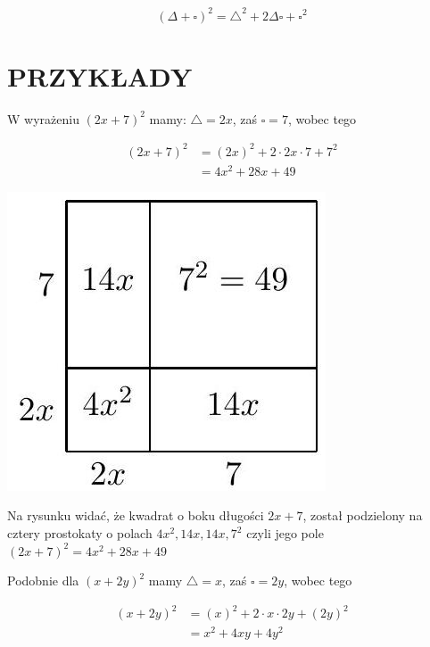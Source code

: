 \documentclass[10pt]{article}
\begin{document}
\[
(\Delta+\square)^{2}=\triangle^{2}+2 \Delta \square+\square^{2}
\]

\section*{PRZYKŁADY}
W wyrażeniu \((2 x+7)^{2}\) mamy: \(\triangle=2 x\), zaś \(\square=7\), wobec tego

\[
\begin{aligned}
(2 x+7)^{2} & =(2 x)^{2}+2 \cdot 2 x \cdot 7+7^{2} \\
& =4 x^{2}+28 x+49
\end{aligned}
\]

\begin{center}
\includegraphics[max width=\textwidth]{2024_11_21_8f01584889ff06348ae7g-103}
\end{center}

Na rysunku widać, że kwadrat o boku długości \(2 x+7\), został podzielony na cztery prostokaty o polach \(4 x^{2}, 14 x, 14 x, 7^{2}\) czyli jego pole \((2 x+7)^{2}=4 x^{2}+28 x+49\)

Podobnie dla \((x+2 y)^{2}\) mamy \(\triangle=x\), zaś \(\square=2 y\), wobec tego

\[
\begin{aligned}
(x+2 y)^{2} & =(x)^{2}+2 \cdot x \cdot 2 y+(2 y)^{2} \\
& =x^{2}+4 x y+4 y^{2}
\end{aligned}
\]
\end{document}
